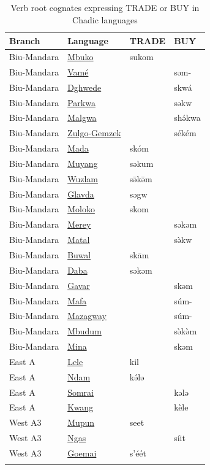 \begin{table}
	\caption{Verb root cognates expressing TRADE or BUY in Chadic languages}
	\label{tab:cognates}
	\begin{tabular}{llll}
		\lsptoprule
	Branch &	 Language 				&  TRADE &  BUY \\
		\midrule
Biu-Mandara & \hyperref[mbuk]{Mbuko} &   sukom &     \\
Biu-Mandara & \hyperref[vame]{Vamé} &  		  &    səm-  \\
Biu-Mandara & \hyperref[dghw]{Dghwede} &  	  &    skwá  \\
Biu-Mandara & \hyperref[park]{Parkwa} &  		  &    səkw  \\
Biu-Mandara & \hyperref[malg]{Malgwa} &  		  &    shə́kwa  \\
Biu-Mandara & \hyperref[zulg]{Zulgo-Gemzek} &    &    sékém  \\
Biu-Mandara & \hyperref[mada]{Mada} &  	skóm	  &      \\
Biu-Mandara & \hyperref[muya]{Muyang} &  	səkum	  &      \\
Biu-Mandara & \hyperref[wuzl]{Wuzlam} &  	sə̄kə̄m	  &      \\
Biu-Mandara & \hyperref[glav]{Glavda} &  	səgw	  &      \\
Biu-Mandara & \hyperref[molo]{Moloko} &  	skom	  &      \\
Biu-Mandara & \hyperref[mere]{Merey} &  			  &  səkəm    \\
Biu-Mandara & \hyperref[mata]{Matal} &  			  &  sə̀kw    \\
Biu-Mandara & \hyperref[buwa]{Buwal} &  	skām	  &     \\
Biu-Mandara & \hyperref[daba]{Daba} &  	səkəm	  &     \\
Biu-Mandara & \hyperref[gava]{Gavar} &  	 		  &  skəm   \\
Biu-Mandara & \hyperref[mafa]{Mafa} &  	 		  &  súm-   \\
Biu-Mandara & \hyperref[maza]{Mazagway} &  	 		  &  súm-   \\
Biu-Mandara & \hyperref[mbud]{Mbudum} &  	 		  &  sə̀kə̀m   \\
Biu-Mandara & \hyperref[mina]{Mina} &  	 		  &  skəm   \\
\midrule
East A & \hyperref[lele]{Lele} &  	kil 		  &     \\
East A & \hyperref[ndam]{Ndam} &  	kə́lə 		  &     \\
East A & \hyperref[somr]{Somrai} &  	 		  &    kələ  \\
East A & \hyperref[kwan]{Kwang} &  	 		  &    kèle  \\
\midrule
West A3 & \hyperref[mupu]{Mupun} &  	seet 		  &     \\
West A3 & \hyperref[ngas]{Ngas} &  	 		  &    síit  \\
West A3 & \hyperref[goem]{Goemai} &  s'éét	 		  &      \\
		\lspbottomrule
	\end{tabular}
\end{table}

